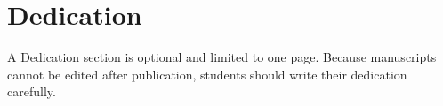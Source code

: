 \chapter*{Dedication}

A Dedication section is optional and limited to one page. Because manuscripts cannot be edited after publication, students should write their dedication carefully.
